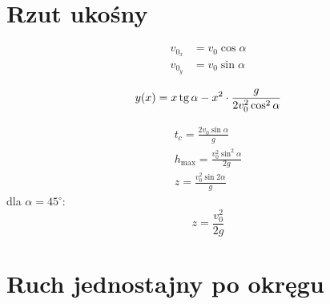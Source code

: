 \section{Rzut ukośny}
%
%
%
%
\begin{align*}
  v_{0_x} &= v_0 \cos \alpha\\
  v_{0_y} &= v_0 \sin \alpha
\end{align*}

\begin{equation}
  y(x) = x \operatorname{tg} \alpha - x^2 \cdot \frac{g}{2 v_0^2 \cos^2 \alpha}
\end{equation}

\begin{gather*}
  t_c = \frac{2 v_0 \sin \alpha}{g}\\
  h_\text{max} = \frac{v_0^2 \sin^2 \alpha}{2g}\\
  z = \frac{v_0^2 \sin 2\alpha}{g}
\end{gather*}
dla $\alpha = 45^\circ$:
\begin{equation*}
  z = \frac{v_0^2}{2g}
\end{equation*}

\section{Ruch jednostajny po okręgu}

